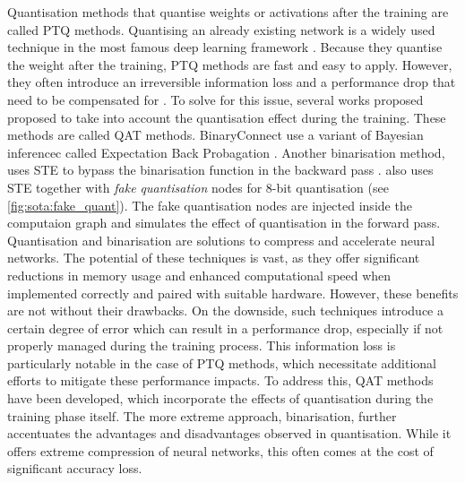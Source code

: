 Quantisation methods that quantise weights or activations after the training are
called \ac{PTQ} methods. Quantising an already existing network is a widely used
technique in the most famous deep learning framework
\cite{ncnn,qnnpack,snapdragon,tensorrt}. Because they quantise the weight after
the training, \ac{PTQ} methods are fast and easy to apply. However, they often
introduce an irreversible information loss and  a performance drop that need to
be compensated for \cite{DBLP:journals/ijon/LiangGWSZ21}. To solve for this
issue, several works proposed proposed to take into account the quantisation
effect during the training. These methods are called \ac{QAT} methods.
BinaryConnect \cite{courbariaux2015binaryconnect} use a variant of Bayesian
inferencec called Expectation Back Probagation
\cite{DBLP:journals/corr/ChengSML15,DBLP:conf/nips/SoudryHM14}. Another
binarisation method, uses \ac{STE} \cite{DBLP:journals/corr/BengioLC13} to
bypass the binarisation function in the backward pass
\cite{DBLP:conf/nips/HubaraCSEB16}. \cite{DBLP:conf/cvpr/JacobKCZTHAK18} also
uses \ac{STE} together with \emph{fake quantisation} nodes for 8-bit
quantisation (see \cref{fig:sota:fake_quant}). The fake quantisation nodes are
injected inside the computaion graph and simulates the effect of quantisation in
the forward pass.\\

Quantisation and binarisation are solutions to compress and accelerate neural
networks. The potential of these techniques is vast, as they offer significant
reductions in memory usage and enhanced computational speed when implemented
correctly and paired with suitable hardware. However, these benefits are not
without their drawbacks. On the downside, such techniques introduce a certain
degree of error which can result in a performance drop, especially if not
properly managed during the training process. This information loss is
particularly notable in the case of \acl{PTQ} methods, which necessitate
additional efforts to mitigate these performance impacts. To address this,
\ac{QAT} methods have been developed, which incorporate the effects of
quantisation during the training phase itself. The more extreme approach,
binarisation, further accentuates the advantages and disadvantages observed in
quantisation. While it offers extreme compression of neural networks, this often
comes at the cost of significant accuracy loss.\\


